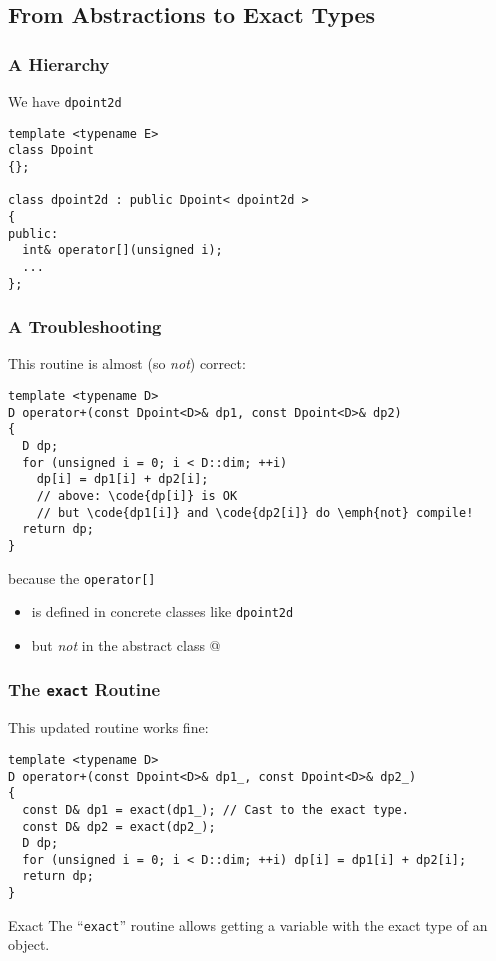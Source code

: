 \documentclass{beamer}
\newcommand{\code}[1]{{\scriptsize{\texttt{#1}}}\xspace}
\begin{document}
\subsection{From Abstractions to Exact Types}


\begin{frame}[fragile]
  \frametitle{A Hierarchy}

We have \code{dpoint2d}

\begin{lstlisting}
template <typename E>
class Dpoint
{};

class dpoint2d : public Dpoint< dpoint2d >
{
public:
  int& operator[](unsigned i);
  ...
};
\end{lstlisting}

\end{frame}



\begin{frame}[fragile]
  \frametitle{A Troubleshooting}

This routine is almost (so \emph{not}) correct:
\begin{lstlisting}
template <typename D>
D operator+(const Dpoint<D>& dp1, const Dpoint<D>& dp2)
{
  D dp;
  for (unsigned i = 0; i < D::dim; ++i)
    dp[i] = dp1[i] + dp2[i];
    // above: \code{dp[i]} is OK
    // but \code{dp1[i]} and \code{dp2[i]} do \emph{not} compile!
  return dp;
}
\end{lstlisting}

because the \code{operator[]}
\begin{itemize}
\item is defined in concrete classes like \code{dpoint2d}
\item but \emph{not} in the abstract class
  @
\end{itemize}

\end{frame}


\begin{frame}[fragile]
  \frametitle{The \code{exact} Routine}

This updated routine works fine:

\begin{lstlisting}
template <typename D>
D operator+(const Dpoint<D>& dp1_, const Dpoint<D>& dp2_)
{
  const D& dp1 = exact(dp1_); // Cast to the exact type.
  const D& dp2 = exact(dp2_);
  D dp;
  for (unsigned i = 0; i < D::dim; ++i) dp[i] = dp1[i] + dp2[i];
  return dp;
}
\end{lstlisting}

\begin{block}{Exact}
  The ``\code{exact}'' routine allows getting a variable with the
  exact type of an object.
\end{block}

\end{frame}
\end{document}
